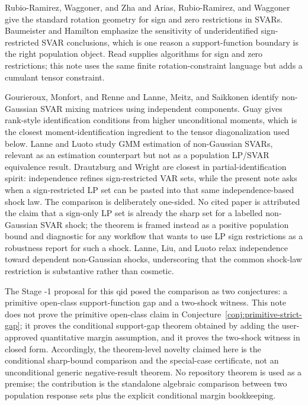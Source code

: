 \documentclass[11pt]{article}
\theoremstyle{definition}
\theoremstyle{plain}
\theoremstyle{remark}
\begin{document}
Rubio-Ramirez, Waggoner, and Zha \cite{RubioRamirezWaggonerZha2010} and Arias,
Rubio-Ramirez, and Waggoner \cite{AriasRubioRamirezWaggoner2018} give the
standard rotation geometry for sign and zero restrictions in SVARs.  Baumeister
and Hamilton \cite{BaumeisterHamilton2015} emphasize the sensitivity of
underidentified sign-restricted SVAR conclusions, which is one reason a
support-function boundary is the right population object.  Read
\cite{Read2022} supplies algorithms for sign and zero restrictions; this note
uses the same finite rotation-constraint language but adds a cumulant tensor
constraint.

Gourieroux, Monfort, and Renne \cite{GourierouxMonfortRenne2017} and Lanne,
Meitz, and Saikkonen \cite{LanneMeitzSaikkonen2017} identify non-Gaussian SVAR
mixing matrices using independent components.  Guay \cite{Guay2021} gives
rank-style identification conditions from higher unconditional moments, which
is the closest moment-identification ingredient to the tensor diagonalization
used below.  Lanne and Luoto \cite{LanneLuoto2021} study GMM estimation of
non-Gaussian SVARs, relevant as an estimation counterpart but not as a
population LP/SVAR equivalence result.  Drautzburg and Wright
\cite{DrautzburgWright2023} are closest in partial-identification spirit:
independence refines sign-restricted VAR sets, while the present note asks
when a sign-restricted LP set can be pasted into that same independence-based
shock law.  The comparison is deliberately one-sided.  No cited paper is
attributed the claim that a sign-only LP set is already the sharp set for a
labelled non-Gaussian SVAR shock; the theorem is framed instead as a positive
population bound and diagnostic for any workflow that wants to use LP sign
restrictions as a robustness report for such a shock.  Lanne, Liu, and Luoto
\cite{LanneLiuLuoto2026} relax independence
toward dependent non-Gaussian shocks, underscoring that the common shock-law
restriction is substantive rather than cosmetic.

The Stage -1 proposal for this qid posed the comparison as two conjectures:
a primitive open-class support-function gap and a two-shock witness.  This
note does not prove the primitive open-class claim in
Conjecture~\ref{conj:primitive-strict-gap}; it proves the conditional
support-gap theorem obtained by adding the user-approved quantitative margin
assumption, and it proves the two-shock witness in closed form.  Accordingly,
the theorem-level novelty claimed here is the conditional sharp-bound
comparison and the special-case certificate, not an unconditional generic
negative-result theorem.  No repository theorem is used as a premise; the
contribution is the standalone algebraic comparison between two population
response sets plus the explicit conditional margin bookkeeping.
\end{document}
